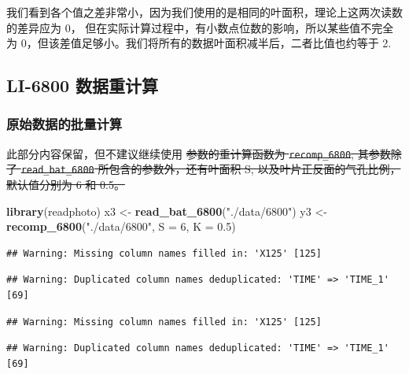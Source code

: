 \documentclass[
]{krantz}
\makeatletter
\newenvironment{Shaded}{\begin{snugshade}}{\end{snugshade}}
\newcommand{\DataTypeTok}[1]{\textcolor[rgb]{0.13,0.29,0.53}{#1}}
\newcommand{\DecValTok}[1]{\textcolor[rgb]{0.00,0.00,0.81}{#1}}
\newcommand{\FloatTok}[1]{\textcolor[rgb]{0.00,0.00,0.81}{#1}}
\newcommand{\KeywordTok}[1]{\textcolor[rgb]{0.13,0.29,0.53}{\textbf{#1}}}
\newcommand{\NormalTok}[1]{#1}
\newcommand{\StringTok}[1]{\textcolor[rgb]{0.31,0.60,0.02}{#1}}
\newenvironment{kframe}{%
\medskip{}
\setlength{\fboxsep}{.8em}
 \def\at@end@of@kframe{}%
 \ifinner\ifhmode%
  \def\at@end@of@kframe{\end{minipage}}%
  \begin{minipage}{\columnwidth}%
 \fi\fi%
 \def\FrameCommand##1{\hskip\@totalleftmargin \hskip-\fboxsep
 \colorbox{shadecolor}{##1}\hskip-\fboxsep
     \hskip-\linewidth \hskip-\@totalleftmargin \hskip\columnwidth}%
 \MakeFramed {\advance\hsize-\width
   \@totalleftmargin\z@ \linewidth\hsize
   \@setminipage}}%
 {\par\unskip\endMakeFramed%
 \at@end@of@kframe}
\renewenvironment{Shaded}{\begin{kframe}}{\end{kframe}}
\makeatother
\begin{document}
我们看到各个值之差非常小，因为我们使用的是相同的叶面积，理论上这两次读数的差异应为 0， 但在实际计算过程中，有小数点位数的影响，所以某些值不完全为 0，但该差值足够小。我们将所有的数据叶面积减半后，二者比值也约等于 2.

\hypertarget{recompute6800}{%
\subsection{LI-6800 数据重计算}\label{recompute6800}}

\hypertarget{raw-batch-68}{%
\subsubsection{原始数据的批量计算}\label{raw-batch-68}}

此部分内容保留，但不建议继续使用
\sout{参数的重计算函数为 \mbox{\texttt{recomp\_6800}}, 其参数除了 \mbox{\texttt{read\_bat\_6800}} 所包含的参数外，还有叶面积 S, 以及叶片正反面的气孔比例，默认值分别为 6 和 0.5。}

\begin{Shaded}
\begin{Highlighting}[]
\KeywordTok{library}\NormalTok{(readphoto)}
\NormalTok{x3 \textless{}{-}}\StringTok{ }\KeywordTok{read\_bat\_6800}\NormalTok{(}\StringTok{"./data/6800"}\NormalTok{)}
\NormalTok{y3 \textless{}{-}}\StringTok{ }\KeywordTok{recomp\_6800}\NormalTok{(}\StringTok{"./data/6800"}\NormalTok{, }\DataTypeTok{S =} \DecValTok{6}\NormalTok{, }\DataTypeTok{K =} \FloatTok{0.5}\NormalTok{)}
\end{Highlighting}
\end{Shaded}

\begin{verbatim}
## Warning: Missing column names filled in: 'X125' [125]
\end{verbatim}

\begin{verbatim}
## Warning: Duplicated column names deduplicated: 'TIME' => 'TIME_1' [69]
\end{verbatim}

\begin{verbatim}
## Warning: Missing column names filled in: 'X125' [125]
\end{verbatim}

\begin{verbatim}
## Warning: Duplicated column names deduplicated: 'TIME' => 'TIME_1' [69]
\end{verbatim}
\end{document}
